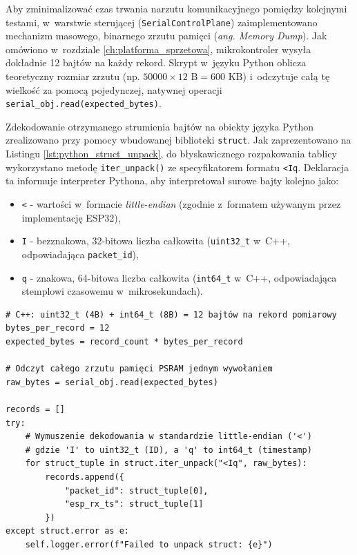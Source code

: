 Aby zminimalizować czas trwania narzutu komunikacyjnego pomiędzy kolejnymi testami, w~warstwie sterującej (\texttt{SerialControlPlane}) zaimplementowano mechanizm masowego, binarnego zrzutu pamięci (\textit{ang. Memory Dump}).
Jak omówiono w~rozdziale \ref{ch:platforma_sprzetowa}, mikrokontroler wysyła dokładnie 12 bajtów na każdy rekord.
Skrypt w~języku Python oblicza teoretyczny rozmiar zrzutu (np. $50000 \times 12 \text{ B} = 600 \text{ KB}$) i~odczytuje całą tę wielkość za pomocą pojedynczej, natywnej operacji \texttt{serial\_obj.read(expected\_bytes)}.

Zdekodowanie otrzymanego strumienia bajtów na obiekty języka Python zrealizowano przy pomocy wbudowanej biblioteki \texttt{struct}.
Jak zaprezentowano na Listingu \ref{lst:python_struct_unpack}, do błyskawicznego rozpakowania tablicy wykorzystano metodę \texttt{iter\_unpack()} ze specyfikatorem formatu \texttt{<Iq}.
Deklaracja ta informuje interpreter Pythona, aby interpretował surowe bajty kolejno jako:
\begin{itemize}
    \item \texttt{<} - wartości w~formacie \textit{little-endian} (zgodnie z~formatem używanym przez implementację ESP32),
    \item \texttt{I} - bezznakowa, 32-bitowa liczba całkowita (\texttt{uint32\_t} w~C++, odpowiadająca \texttt{packet\_id}),
    \item \texttt{q} - znakowa, 64-bitowa liczba całkowita (\texttt{int64\_t} w~C++, odpowiadająca stemplowi czasowemu w~mikrosekundach).
\end{itemize}

\begin{listing}[htbp]
    \caption{Błyskawiczne dekodowanie pamięci binarnej C++ na wysokopoziomowe obiekty słownikowe w~języku Python (\texttt{serial\_cp.py}) \cite{espy_nexus_python_host}.}
    \label{lst:python_struct_unpack}
    \begin{verbatim}
# C++: uint32_t (4B) + int64_t (8B) = 12 bajtów na rekord pomiarowy
bytes_per_record = 12
expected_bytes = record_count * bytes_per_record

# Odczyt całego zrzutu pamięci PSRAM jednym wywołaniem
raw_bytes = serial_obj.read(expected_bytes)

records = []
try:
    # Wymuszenie dekodowania w standardzie little-endian ('<')
    # gdzie 'I' to uint32_t (ID), a 'q' to int64_t (timestamp)
    for struct_tuple in struct.iter_unpack("<Iq", raw_bytes):
        records.append({
            "packet_id": struct_tuple[0], 
            "esp_rx_ts": struct_tuple[1]
        })
except struct.error as e:
    self.logger.error(f"Failed to unpack struct: {e}")
\end{verbatim}
\end{listing}

